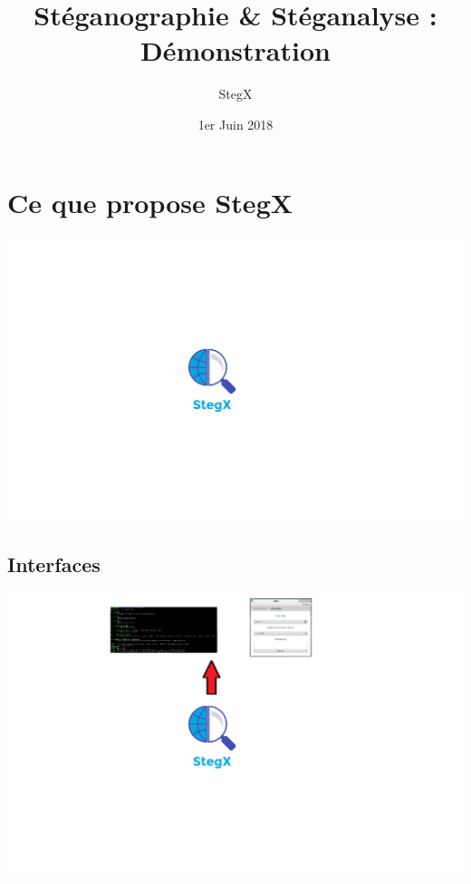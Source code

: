 \documentclass{beamer}
\title{Stéganographie \& Stéganalyse : Démonstration}
\author{StegX}
\institute{UFR des Sciences Versailles - L3 Informatique}
\date{1er Juin 2018}
\begin{document}
  \begin{frame}
  \titlepage
  \end{frame}
  
  \section{Ce que propose StegX}
    
	\begin{frame}
  \includegraphics[scale=0.3]{pictures/bilan_0}
  \end{frame}
  
  \subsection{Interfaces}
  
  \begin{frame}
  \includegraphics[scale=0.3]{pictures/bilan_1}
  \end{frame}
  
\end{document}
